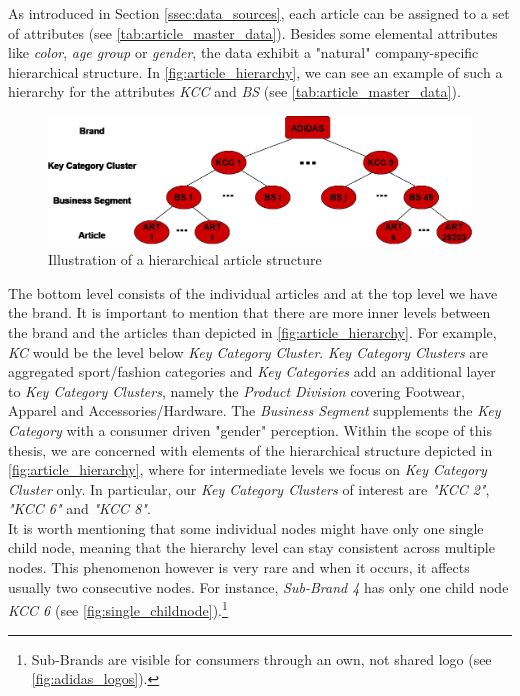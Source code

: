 


As introduced in Section \ref{ssec:data_sources}, each article can be assigned to a set of attributes (see \autoref{tab:article_master_data}). 
Besides some elemental attributes like \textit{color}, \textit{age group} or \textit{gender}, the data exhibit a "natural" company-specific hierarchical structure. In \autoref{fig:article_hierarchy}, we can see an example of such a hierarchy for the attributes \textit{\ac{KCC}} and \textit{\ac{BS}} (see \autoref{tab:article_master_data}).
\\

\begin{figure}[H]
\centering
  \includegraphics[width=0.95\linewidth]{figures/article_tree_KCC_BS.eps}
  \caption{Illustration of a hierarchical article structure}
  \label{fig:article_hierarchy}
\end{figure}

The bottom level consists of the individual articles and at the top level we have the brand. It is important to mention that there are more inner levels between the brand and the articles than depicted in \autoref{fig:article_hierarchy}. For example, \textit{\ac{KC}} would be the level below \textit{Key Category Cluster}. \textit{Key Category Clusters} are aggregated sport/fashion categories and \textit{Key Categories} add an additional layer to \textit{Key Category Clusters}, namely the \textit{Product Division} covering Footwear, Apparel and Accessories/Hardware. The \textit{Business Segment} supplements the \textit{Key Category} with a consumer driven "gender" perception.
Within the scope of this thesis, we are concerned with elements of the hierarchical structure depicted in \autoref{fig:article_hierarchy}, where for intermediate levels we focus on \textit{Key Category Cluster} only. In particular, our \textit{Key Category Clusters} of interest are \textit{"KCC 2"}, \textit{"KCC 6"} and \textit{"KCC 8"}.
\\
It is worth mentioning that some individual nodes might have only one single child node, meaning that the hierarchy level can stay consistent across multiple nodes. This phenomenon however is very rare and when it occurs, it affects usually two consecutive nodes. For instance, \textit{Sub-Brand 4} has only one child node \textit{KCC 6} (see \autoref{fig:single_childnode}).\footnote{Sub-Brands are visible for consumers through an own, not shared logo (see \autoref{fig:adidas_logos}).}
\\

